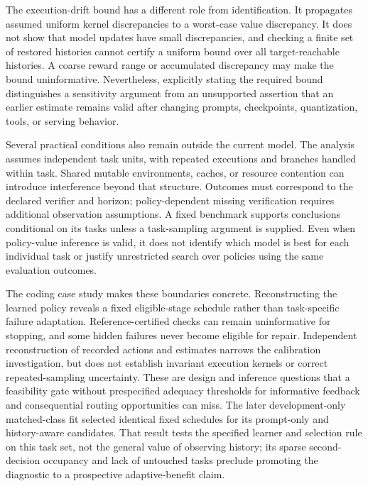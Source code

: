 The execution-drift bound has a different role from identification. It propagates assumed uniform kernel discrepancies to a worst-case value discrepancy. It does not show that model updates have small discrepancies, and checking a finite set of restored histories cannot certify a uniform bound over all target-reachable histories. A coarse reward range or accumulated discrepancy may make the bound uninformative. Nevertheless, explicitly stating the required bound distinguishes a sensitivity argument from an unsupported assertion that an earlier estimate remains valid after changing prompts, checkpoints, quantization, tools, or serving behavior.

Several practical conditions also remain outside the current model. The analysis assumes independent task units, with repeated executions and branches handled within task. Shared mutable environments, caches, or resource contention can introduce interference beyond that structure. Outcomes must correspond to the declared verifier and horizon; policy-dependent missing verification requires additional observation assumptions. A fixed benchmark supports conclusions conditional on its tasks unless a task-sampling argument is supplied. Even when policy-value inference is valid, it does not identify which model is best for each individual task or justify unrestricted search over policies using the same evaluation outcomes.

The coding case study makes these boundaries concrete. Reconstructing the learned policy reveals a fixed
eligible-stage schedule rather than task-specific failure adaptation. Reference-certified checks can remain
uninformative for stopping, and some hidden failures never become eligible for repair. Independent reconstruction
of recorded actions and estimates narrows the calibration investigation, but does not establish invariant
execution kernels or correct repeated-sampling uncertainty. These are design and inference questions that a
feasibility gate without prespecified adequacy thresholds for informative feedback and consequential routing
opportunities can miss.
The later development-only matched-class fit selected identical fixed schedules for its prompt-only and
history-aware candidates. That result tests the specified learner and selection rule on this task set, not the
general value of observing history; its sparse second-decision occupancy and lack of untouched tasks preclude
promoting the diagnostic to a prospective adaptive-benefit claim.

